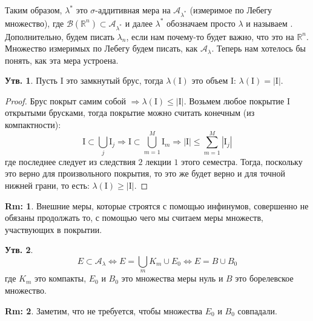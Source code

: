 \documentclass[12pt]{article}
\newcommand{\MR}{\mathbb{R}}
\newcommand{\MI}{\mathrm{I}}
\newcommand{\MA}{\mathcal{A}}
\newcommand{\MB}{\mathcal{B}}
\theoremstyle{definition}
\newtheorem{rem}{Rm:}
\newtheorem{prop}{Утв.}
\newcommand{\ddsum}[2]{\displaystyle\sum\limits_{#1}^{#2}}
\begin{document}
Таким образом, $\lambda^*$ это $\sigma$-аддитивная мера на $\MA_{\lambda^*}$ (измеримое по Лебегу множество), где $\MB(\MR^n)\subset \MA_{\lambda^*}$ и далее $\lambda^*$ обозначаем просто $\lambda$ и называем . Дополнительно, будем писать $\lambda_n$, если нам почему-то будет важно, что это на $\MR^n$. Множество измеримых по Лебегу будем писать, как $\MA_\lambda$. Теперь нам хотелось бы понять, как эта мера устроена.
\begin{prop}
	Пусть $\MI$ это замкнутый брус, тогда $\lambda(\MI)$ это объем $\MI$: $\lambda(\MI) = |\MI|$.
\end{prop}
\begin{proof}
	Брус покрыт самим собой $\Rightarrow \lambda(\MI) \leq |\MI|$. Возьмем любое покрытие $\MI$ открытыми брусками, тогда покрытие можно считать конечным (из компактности):
	$$
		\MI \subset \bigcup\limits_j \MI_j \Rightarrow \MI \subset \bigcup\limits_{m = 1}^{M} \MI_m \Rightarrow |\MI | \leq \ddsum{m = 1}{M}|\MI_j|
	$$
	где последнее следует из следствия $2$ лекции $1$ этого семестра. Тогда, поскольку это верно для произвольного покрытия, то это же будет верно и для точной нижней грани, то есть: $\lambda(\MI) \geq |\MI|$.
\end{proof}
\begin{rem}
	Внешние меры, которые строятся с помощью инфинумов, совершенно не обязаны продолжать то, с помощью чего мы считаем меры множеств, участвующих в покрытии.
\end{rem}
\begin{prop}
	$$
		E \subset \MA_\lambda \Leftrightarrow E = \bigcup\limits_m K_m \cup E_0 \Leftrightarrow E = B \cup B_0
	$$ 
	где $K_m$ это компакты, $E_0$ и $B_0$ это множества меры нуль и $B$ это борелевское множество.
\end{prop}
\begin{rem}
	Заметим, что не требуется, чтобы множества $E_0$ и $B_0$ совпадали.
\end{rem}
\end{document}
